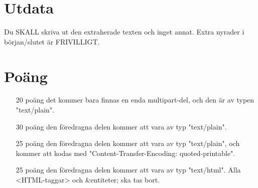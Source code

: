 \section*{Utdata}
Du SKALL skriva ut den extraherade texten och inget annat. Extra nyrader i början/slutet är FRIVILLIGT.

\section*{Poäng}

\begin{enumerate}
	\item[20 poäng] det kommer bara finnas en enda multipart-del, och den är av typen "text/plain".
	\item[30 poäng] den föredragna delen kommer att vara av typ "text/plain".
	\item[25 poäng] den föredragna delen kommer att vara av typ "text/plain", och kommer att kodas med "Content-Transfer-Encoding: quoted-printable".
  \item[25 poäng] den föredragna delen kommer att vara av typ "text/html". Alla <HTML-taggar> och \&entiteter; ska tas bort.
\end{enumerate}

